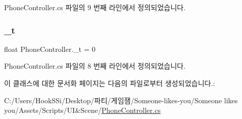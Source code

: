 Phone\+Controller.\+cs 파일의 9 번째 라인에서 정의되었습니다.

\mbox{\label{class_phone_controller_ac77b92e249c4d33f97abb1d98fab21b3}} 
\subsubsection{\texorpdfstring{\_t}{\_t}}
{\footnotesize\ttfamily float Phone\+Controller.\+\_\+t = 0\hspace{0.3cm}{\ttfamily [private]}}



Phone\+Controller.\+cs 파일의 8 번째 라인에서 정의되었습니다.



이 클래스에 대한 문서화 페이지는 다음의 파일로부터 생성되었습니다.\+:\begin{DoxyCompactItemize}
\item 
C\+:/\+Users/\+Hook\+S\+Si/\+Desktop/파티/게임잼/\+Someone-\/likes-\/you/\+Someone likes you/\+Assets/\+Scripts/\+U\+I\&\+Scene/\mbox{\hyperlink{_phone_controller_8cs}{Phone\+Controller.\+cs}}\end{DoxyCompactItemize}
